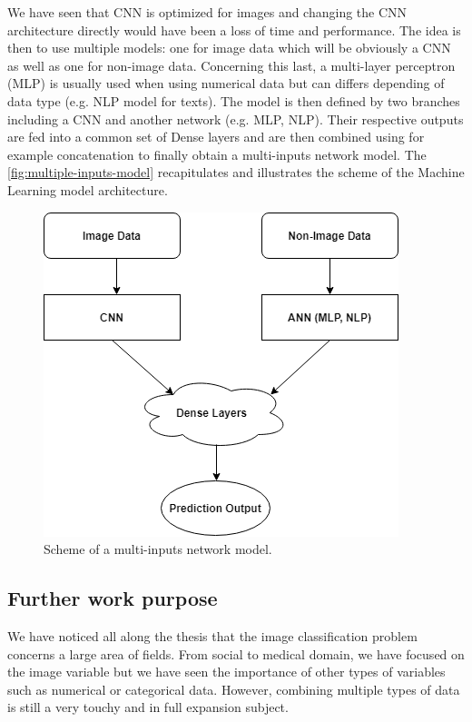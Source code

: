 \documentclass[11pt, openany]{report}
\theoremstyle{plain}
\theoremstyle{definition}
\theoremstyle{remark}
\begin{document}
We have seen that CNN is optimized for images and changing the CNN architecture directly would have been a loss of time and performance. The idea is then to use multiple models: one for image data which will be obviously a CNN as well as one for non-image data. Concerning this last, a multi-layer perceptron (MLP) is usually used when using numerical data but can differs depending of data type (e.g. NLP model for texts). The model is then defined by two branches including a CNN and another network (e.g. MLP, NLP). Their respective outputs are fed into a common set of Dense layers and are then combined  using for example concatenation to finally obtain a multi-inputs network model. The \autoref{fig:multiple-inputs-model} recapitulates and illustrates the scheme of the Machine Learning model architecture. 

\begin{figure}[H]
  \centering
  \includegraphics[scale=0.7]{figures/multiple-inputs-model.png}
  \caption{Scheme of a multi-inputs network model.}
  \label{fig:multiple-inputs-model}
\end{figure}
       

\subsection{Further work purpose}
We have noticed all along the thesis that the image classification problem concerns a large area of fields. From social to medical domain, we have focused on the image variable but we have seen the importance of other types of variables such as numerical or categorical data. However, combining multiple types of data is still a very touchy and in full expansion subject. 
\end{document}
